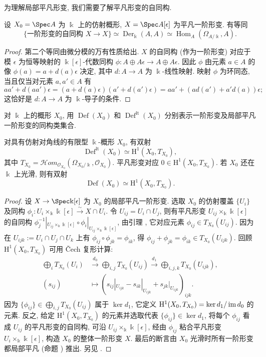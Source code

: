 为理解局部平凡形变, 我们需要了解平凡形变的自同构.
\begin{lemma}\label{src:C.1.10}
设 $X_0=\Spec A$ 为 $\Bbbk$ 上的仿射概形, $X=\Spec A[\epsilon]$ 为平凡一阶形变. 有等同
\[
\{\text{一阶形变的自同构 }X\to X\}\simeq\operatorname{Der}_{\Bbbk}(A,A)\simeq\operatorname{Hom}_A(\Omega_{A/\Bbbk},A).
\]
\end{lemma}
\begin{proof}
第二个等同由微分模的万有性质给出. $X$ 的自同构 (作为一阶形变) 对应于模 $\epsilon$ 为恒等映射的 $\Bbbk[\epsilon]$-代数同构 $\phi:A\oplus A\epsilon\to A\oplus A\epsilon$. 因此 $\phi$ 由元素 $a\in A$ 的像 $\phi(a)=a+d(a)\epsilon$ 决定, 其中 $d:A\to A$ 为 $\Bbbk$-线性映射. 映射 $\phi$ 为环同态, 当且仅当对元素 $a,a'\in A$ 有
\[
aa'+d(aa')\epsilon=(a+d(a)\epsilon)(a'+d(a')\epsilon)=aa'+(ad(a')+a'd(a))\epsilon;
\]
这恰好是 $d:A\to A$ 为 $\Bbbk$-导子的条件.
\end{proof}
对 $\Bbbk$ 上的概形 $X_0$, 用 $\operatorname{Def}(X_0)$ 和 $\operatorname{Def}^{\mathrm{lt}}(X_0)$ 分别表示一阶形变及局部平凡一阶形变的同构类集合.
\begin{proposition}\label{src:C.1.11}
对具有仿射对角线的有限型 $\Bbbk$-概形 $X_0$, 有双射
\[
\operatorname{Def}^{\mathrm{lt}}(X_0)\simeq\mathrm H^1(X_0,T_{X_0}),
\]
其中 $T_{X_0}=\mathcal Hom_{\mathcal O_{X_0}}(\Omega_{X_0/\Bbbk},\mathcal O_{X_0})$. 平凡形变对应 $0\in\mathrm H^1(X_0,T_{X_0})$. 若 $X_0$ 还在 $\Bbbk$ 上光滑, 则有双射
\[
\operatorname{Def}(X_0)\simeq\mathrm H^1(X_0,T_{X_0}).
\]
\end{proposition}
\begin{proof}
设 $X\to\Spec\Bbbk[\epsilon]$ 为 $X_0$ 的局部平凡一阶形变. 选取 $X_0$ 的仿射覆盖 $\{U_i\}$ 及同构 $\phi_i:U_i\times_{\Bbbk}\Bbbk[\epsilon]\xrightarrow{\sim}X\cap U_i$. 令 $U_{ij}=U_i\cap U_j$, 则有平凡形变 $U_{ij}\times_{\Bbbk}\Bbbk[\epsilon]$ 的自同构 $\phi_j^{-1}|_{U_{ij}\times_{\Bbbk}\Bbbk[\epsilon]}\circ\phi_i|_{U_{ij}\times_{\Bbbk}\Bbbk[\epsilon]}$, 由引理 , 它对应元素 $\phi_{ij}\in T_{X_0}(U_{ij})$. 因为在 $U_{ijk}:=U_i\cap U_j\cap U_k$ 上有 $\phi_{ij}\circ\phi_{jk}=\phi_{ik}$, 得 $\phi_{ij}+\phi_{jk}=\phi_{ik}\in T_{X_0}(U_{ijk})$. 回顾 $\mathrm H^1(X_0,T_{X_0})$ 可用 Čech 复形计算:
\[
\begin{aligned}
\bigoplus_iT_{X_0}(U_i)&\xrightarrow{d_0}\bigoplus_{i,j}T_{X_0}(U_{ij})\xrightarrow{d_1}\bigoplus_{i,j,k}T_{X_0}(U_{ijk}),\\
(s_{ij})&\longmapsto(s_{ij}|_{U_{ijk}}-s_{ik}|_{U_{ijk}}+s_{jk}|_{U_{ijk}})_{ijk}.
\end{aligned}
\]
因为 $\{\phi_{ij}\}\in\bigoplus_{i,j}T_{X_0}(U_{ij})$ 属于 $\ker d_1$, 它定义 $\mathrm H^1(X_0,T_{X_0})=\ker d_1/\operatorname{im} d_0$ 的元素. 反之, 给定 $\mathrm H^1(X_0,T_{X_0})$ 的元素并选取代表 $\{\phi_{ij}\}\in\ker d_1$, 将每个 $\phi_{ij}$ 看成 $U_{ij}$ 的平凡形变的自同构, 可沿 $U_{ij}\times_{\Bbbk}\Bbbk[\epsilon]$, 经由 $\phi_{ij}$ 粘合平凡形变 $U_i\times_{\Bbbk}\Bbbk[\epsilon]$, 构造 $X_0$ 的整体一阶形变 $X$. 最后的断言由 $X_0$ 光滑时所有一阶形变都局部平凡 (命题 ) 推出. 另见 \cite[习题 III.$4.10$ 和例 III.$9.13.2$]{Har77}.
\end{proof}
